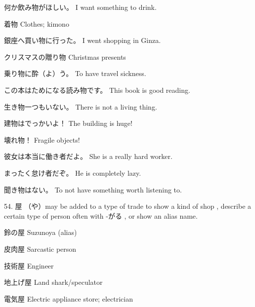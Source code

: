 \par{何か飲み物がほしい。 \hfill\break
I want something to drink. }

\par{着物 \hfill\break
Clothes; kimono }

\par{銀座へ買い物に行った。 \hfill\break
I went shopping in Ginza. }

\par{クリスマスの贈り物 \hfill\break
Christmas presents }

\par{乗り物に酔（よ）う。 \hfill\break
To have travel sickness. }

\par{この本はためになる読み物です。 \hfill\break
This book is good reading. }

\par{生き物一つもいない。 \hfill\break
There is not a living thing. }

\par{建物はでっかいよ！ \hfill\break
The building is huge! }

\par{壊れ物！ \hfill\break
Fragile objects! }

\par{彼女は本当に働き者だよ。 \hfill\break
She is a really hard worker. }

\par{まったく怠け者だぞ。 \hfill\break
He is completely lazy. }

\par{聞き物はない。 \hfill\break
To not have something worth listening to. }

\par{54. 屋 （や）may be added to a type of trade to show a kind of shop , describe a certain type of person often with -がる , or show an alias name. }

\par{鈴の屋 \hfill\break
Suzunoya (alias) }

\par{皮肉屋 \hfill\break
Sarcastic person }

\par{技術屋 \hfill\break
Engineer }

\par{地上げ屋 \hfill\break
Land shark\slash speculator }

\par{電気屋 \hfill\break
Electric appliance store; electrician }

